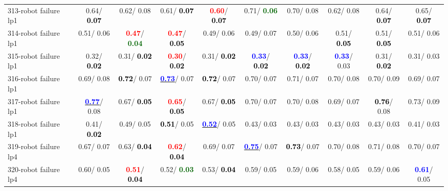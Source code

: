 \begin{table}[h]
\begin{center}
{\begin{tabular}{lc|c|c|c|c|c|c|c|c}
313-robot failure lp1 &   0.64/\textcolor{black}{\textbf{  0.07}} &   0.62/  0.08 &   0.61/\textcolor{black}{\textbf{  0.07}} & \textcolor{red}{\textbf{  0.60}}/\textcolor{black}{\textbf{  0.07}} &   0.71/\textcolor{darkgreen}{\textbf{  0.06}} &   0.70/  0.08 &   0.62/  0.08 &   0.64/\textcolor{black}{\textbf{  0.07}} &   0.65/\textcolor{black}{\textbf{  0.07}} \\
314-robot failure lp1 &   0.51/  0.06 & \textcolor{red}{\textbf{  0.47}}/\textcolor{darkgreen}{\textbf{  0.04}} & \textcolor{red}{\textbf{  0.47}}/\textcolor{black}{\textbf{  0.05}} &   0.49/  0.06 &   0.49/  0.07 &   0.50/  0.06 &   0.51/\textcolor{black}{\textbf{  0.05}} &   0.51/\textcolor{black}{\textbf{  0.05}} &   0.51/  0.06 \\
315-robot failure lp1 &   0.32/\textcolor{black}{\textbf{  0.02}} &   0.31/\textcolor{black}{\textbf{  0.02}} & \textcolor{red}{\textbf{  0.30}}/\textcolor{black}{\textbf{  0.02}} &   0.31/\textcolor{black}{\textbf{  0.02}} & \textcolor{blue}{\textbf{  0.33}}/\textcolor{black}{\textbf{  0.02}} & \textcolor{blue}{\textbf{  0.33}}/\textcolor{black}{\textbf{  0.02}} & \textcolor{blue}{\textbf{  0.33}}/  0.03 &   0.31/\textcolor{black}{\textbf{  0.02}} &   0.31/  0.03 \\
316-robot failure lp1 &   0.69/  0.08 & \textcolor{black}{\textbf{  0.72}}/  0.07 & \underline{\textcolor{blue}{\textbf{  0.73}}}/  0.07 & \textcolor{black}{\textbf{  0.72}}/  0.07 &   0.70/  0.07 &   0.71/  0.07 &   0.70/  0.08 &   0.70/  0.09 &   0.69/  0.07 \\ \hline
317-robot failure lp1 & \underline{\textcolor{blue}{\textbf{  0.77}}}/  0.08 &   0.67/\textcolor{black}{\textbf{  0.05}} & \textcolor{red}{\textbf{  0.65}}/\textcolor{black}{\textbf{  0.05}} &   0.67/\textcolor{black}{\textbf{  0.05}} &   0.70/  0.07 &   0.70/  0.08 &   0.69/  0.07 & \textcolor{black}{\textbf{  0.76}}/  0.08 &   0.73/  0.09 \\
318-robot failure lp1 &   0.41/\textcolor{black}{\textbf{  0.02}} &   0.49/  0.05 & \textcolor{black}{\textbf{  0.51}}/  0.05 & \underline{\textcolor{blue}{\textbf{  0.52}}}/  0.05 &   0.43/  0.03 &   0.43/  0.03 &   0.43/  0.03 &   0.43/  0.03 &   0.41/  0.03 \\
319-robot failure lp4 &   0.67/  0.07 &   0.63/\textcolor{black}{\textbf{  0.04}} & \textcolor{red}{\textbf{  0.62}}/\textcolor{black}{\textbf{  0.04}} &   0.69/  0.07 & \underline{\textcolor{blue}{\textbf{  0.75}}}/  0.07 & \textcolor{black}{\textbf{  0.73}}/  0.07 &   0.70/  0.08 &   0.71/  0.08 &   0.70/  0.07 \\
320-robot failure lp4 &   0.60/  0.05 & \textcolor{red}{\textbf{  0.51}}/\textcolor{black}{\textbf{  0.04}} &   0.52/\textcolor{darkgreen}{\textbf{  0.03}} &   0.53/\textcolor{black}{\textbf{  0.04}} &   0.59/  0.05 &   0.59/  0.06 &   0.58/  0.05 &   0.59/  0.06 & \textcolor{blue}{\textbf{  0.61}}/  0.05 \\\end{tabular}}\label{stratsALCKappa9Allallb}
\end{center}
\end{table}
